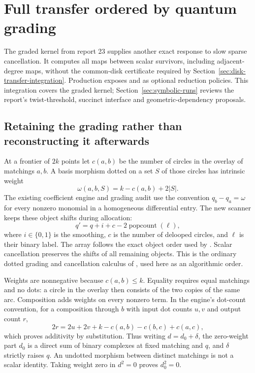 \section{Full transfer ordered by quantum grading}
\label{sec:graded-transfer}

The graded kernel from report 23 supplies another exact response to slow
sparse cancellation.  It computes all maps between scalar survivors,
including adjacent-degree maps, without the common-disk certificate required
by Section~\ref{sec:disk-transfer-integration}.  Production exposes  and
 as optional reduction policies.  This integration
covers the graded kernel; Section~\ref{sec:symbolic-runs} reviews the report's
twist-threshold, succinct interface and geometric-dependency proposals.

\subsection{Retaining the grading rather than reconstructing it afterwards}
At a frontier of $2k$ points let $c(a,b)$ be the number of circles in the
overlay of matchings $a,b$.  A basis morphism dotted on a set $S$ of those
circles has intrinsic weight
\[
 \omega(a,b,S)=k-c(a,b)+2|S|.
\]
The existing coefficient engine and grading audit use the convention
$q_b-q_a=\omega$ for every nonzero monomial in a homogeneous differential
entry.  The new scanner keeps these object shifts during allocation:
\[
 q'=q+i+c-2\operatorname{popcount}(\ell),
\]
where $i\in\{0,1\}$ is the smoothing, $c$ is the number of delooped circles,
and $\ell$ is their binary label.  The array follows the exact object order
used by .  Scalar cancellation preserves the
shifts of all remaining objects.  This is the ordinary dotted grading and
cancellation calculus of \cite{barnatan}, used here as an algorithmic order.

Weights are nonnegative because $c(a,b)\le k$.  Equality requires equal
matchings and no dots: a circle in the overlay then consists of the two
copies of the same arc.  Composition adds weights on every nonzero term.
In the engine's dot-count convention, for a composition through $b$ with
input dot counts $u,v$ and output count $r$,
\[
 2r=2u+2v+k-c(a,b)-c(b,c)+c(a,c),
\]
which proves additivity by substitution.  Thus writing $d=d_0+\delta$,
the zero-weight part $d_0$ is a direct sum of binary complexes at fixed
matching and $q$, and $\delta$ strictly raises $q$.  An undotted morphism
between distinct matchings is not a scalar identity.  Taking weight zero
in $d^2=0$ proves $d_0^2=0$.


